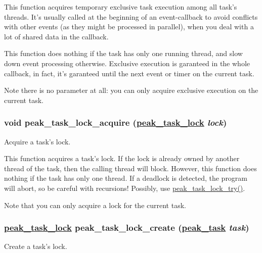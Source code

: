 This function acquires temporary exclusive task execution among all task's threads. It's usually called at the beginning of an event-callback to avoid conflicts with other events (as they might be processed in parallel), when you deal with a lot of shared data in the callback.\par
 This function does nothing if the task has only one running thread, and slow down event processing otherwise. Exclusive execution is garanteed in the whole callback, in fact, it's garanteed until the next event or timer on the current task.\par
 Note there is no parameter at all: you can only acquire exclusive execution on the current task. \hypertarget{group__task__sync_ga4}{
\subsubsection[peak\_\-task\_\-lock\_\-acquire]{\setlength{\rightskip}{0pt plus 5cm}void peak\_\-task\_\-lock\_\-acquire (\hyperlink{group__task__sync_ga0}{peak\_\-task\_\-lock} {\em lock})}}
\label{group__task__sync_ga4}


Acquire a task's lock. 

This function acquires a task's lock. If the lock is already owned by another thread of the task, then the calling thread will block. However, this function does nothing if the task has only one thread. If a deadlock is detected, the program will abort, so be careful with recursions! Possibly, use \hyperlink{group__task__sync_ga5}{peak\_\-task\_\-lock\_\-try()}.\par
 Note that you can only acquire a lock for the current task. \hypertarget{group__task__sync_ga3}{
\subsubsection[peak\_\-task\_\-lock\_\-create]{\setlength{\rightskip}{0pt plus 5cm}\hyperlink{group__task__sync_ga0}{peak\_\-task\_\-lock} peak\_\-task\_\-lock\_\-create (\hyperlink{group__task__common_ga0}{peak\_\-task} {\em task})}}
\label{group__task__sync_ga3}


Create a task's lock. 

